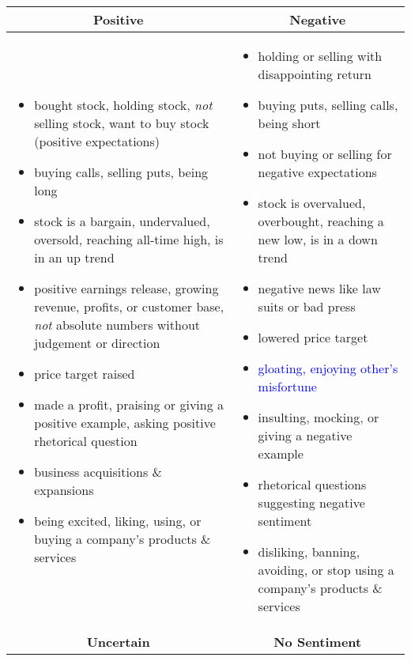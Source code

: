 
\begin{table}[!ht]
\centering
\small
\begin{tabular}{p{7.5cm}p{7.5cm}}
\toprule
\multicolumn{1}{c}{\textbf{Positive}} & \multicolumn{1}{c}{\textbf{Negative}} \\
\midrule

\begin{itemize}[noitemsep,leftmargin=*,topsep=-12pt]
	\item bought stock, holding stock, \emph{not} selling stock, want to buy stock (positive expectations)
	\item buying calls, selling puts, being long
	\item stock is a bargain, undervalued, oversold, reaching all-time high, is in an up trend
	\item positive earnings release, growing revenue, profits, or customer base, \emph{not} absolute numbers without judgement or direction
	\item price target raised
	\item made a profit, praising or giving a positive example, asking positive rhetorical question
	\item business acquisitions \& expansions
	\item being excited, liking, using, or buying a company's products \& services

\end{itemize} & \begin{itemize}[noitemsep,leftmargin=*,topsep=-12pt]
	\item holding or selling with disappointing return
	\item buying puts, selling calls, being short
	\item not buying or selling for negative expectations
 	\item stock is overvalued, overbought, reaching a new low, is in a down trend
 	\item negative news like law suits or bad press
 	\item lowered price target
 	\item \textcolor{blue}{gloating, enjoying other's misfortune}
 	\item insulting, mocking, or giving a negative example
 	\item rhetorical questions suggesting negative sentiment 
	\item disliking, banning, avoiding, or stop using a company's products \& services

\end{itemize}\\
\toprule
\multicolumn{1}{c}{\textbf{Uncertain}} & \multicolumn{1}{c}{\textbf{No Sentiment}} \\
\midrule


\end{tabular}
\end{table}
